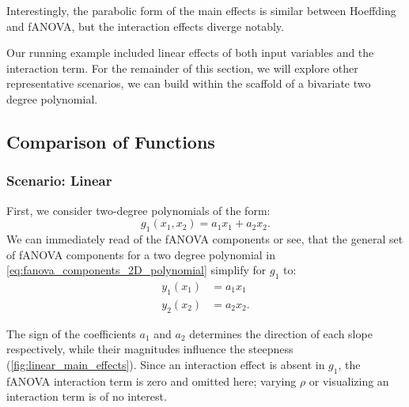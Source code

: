 Interestingly, the parabolic form of the main effects is similar between Hoeffding and fANOVA, but the interaction effects diverge notably.\par
Our running example included linear effects of both input variables and the interaction term. For the remainder of this section, we will explore other representative scenarios, we can build within the scaffold of a bivariate two degree polynomial.

\subsection{Comparison of Functions}
\subsubsection*{Scenario: Linear}
First, we consider two-degree polynomials of the form:
$$g_1(x_1, x_2) = a_1 x_1 + a_2 x_2.$$
We can immediately read of the fANOVA components or see, that the general set of fANOVA components for a two degree polynomial in \autoref{eq:fanova_components_2D_polynomial} simplify for $g_1$ to:
\begin{align*}
    y_1(x_1) &= a_1 x_1 \\
    y_2(x_2) &= a_2 x_2.
\end{align*}

The sign of the coefficients $a_1$ and $a_2$ determines the direction of each slope respectively, while their magnitudes influence the steepness (\autoref{fig:linear_main_effects}). 
Since an interaction effect is absent in $g_1$, the fANOVA interaction term is zero and omitted here; varying $\rho$ or visualizing an interaction term is of no interest.


